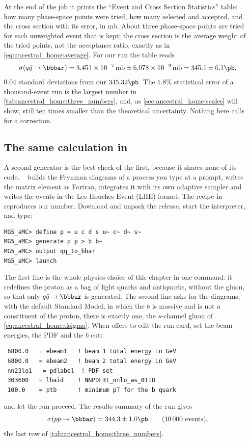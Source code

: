 At the end of the job it prints the ``Event and Cross Section Statistics''
table: how many phase-space points were tried, how many selected and
accepted, and the cross section with its error, in mb. About three
phase-space points are tried for each unweighted event that is kept; the
cross section is the average weight of the tried points, not the acceptance
ratio, exactly as in \cref{eq:ancestral_home:average}. For our run the table
reads
\begin{equation*}
  \sigma(q\bar q\to\bbbar)=3.451\times10^{-7}\,\mathrm{mb}\pm6.078\times10^{-9}\,\mathrm{mb}
  =345.1\pm6.1\pb ,
\end{equation*}
$0.04$ standard deviations from our $345.32\pb$. The $1.8\%$ statistical
error of a thousand-event run is the largest number in
\cref{tab:ancestral_home:three_numbers}, and, as \cref{sec:ancestral_home:scales}
will show, still ten times smaller than the theoretical uncertainty. Nothing
here calls for a correction.

\subsection{The same calculation in \MG}
\label{sec:ancestral_home:madgraph}

A second generator is the best check of the first, because it shares none of
its code. \MG~\cite{Alwall:2014hca} builds the Feynman diagrams of a process
you type at a prompt, writes the matrix element as Fortran, integrates it
with its own adaptive sampler and writes the events in the Les Houches Event
(LHE) format. The recipe in 
reproduces our number. Download and unpack the release, start the
interpreter, and type:
\begin{verbatim}
MG5_aMC> define p = u c d s u~ c~ d~ s~
MG5_aMC> generate p p > b b~
MG5_aMC> output qq_to_bbar
MG5_aMC> launch
\end{verbatim}
The first line is the whole physics choice of this chapter in one command:
it redefines the proton as a bag of light quarks and antiquarks, without the
gluon, so that only $q\bar q\to\bbbar$ is generated. The second line asks
for the diagrams; with the default Standard Model, in which the $b$ is
massive and is not a constituent of the proton, there is exactly one, the
$s$-channel gluon of \cref{eq:ancestral_home:dsigma}. When 
offers to edit the run card, set the beam energies, the PDF and the $b$
\pt cut:
\begin{verbatim}
 6800.0   = ebeam1   ! beam 1 total energy in GeV
 6800.0   = ebeam2   ! beam 2 total energy in GeV
 nn23lo1   = pdlabel  ! PDF set
 303600   = lhaid    ! NNPDF31_nnlo_as_0118
 100.0    = ptb      ! minimum pT for the b quark
\end{verbatim}
and let the run proceed. The results summary of the run gives
\begin{equation*}
  \sigma(pp\to\bbbar)=344.3\pm1.0\pb\qquad(10\,000\text{ events}),
\end{equation*}
the last row of \cref{tab:ancestral_home:three_numbers}.

